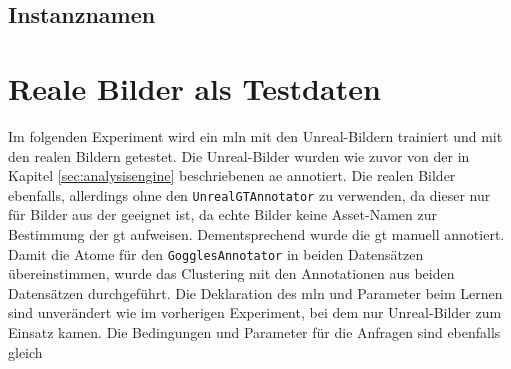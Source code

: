 

\subsection{Instanznamen}


\section{Reale Bilder als Testdaten}

Im folgenden Experiment wird ein \gls{mln} mit den Unreal-Bildern trainiert und mit den realen Bildern getestet. Die Unreal-Bilder wurden wie zuvor von der in Kapitel \ref{sec:analysisengine} beschriebenen \gls{ae} annotiert. Die realen Bilder ebenfalls, allerdings ohne den \texttt{UnrealGTAnnotator} zu verwenden, da dieser nur für Bilder aus der \unreal geeignet ist, da echte Bilder keine Asset-Namen zur Bestimmung der \gls{gt} aufweisen. Dementsprechend wurde die \gls{gt} manuell annotiert. Damit die Atome für den \texttt{GogglesAnnotator} in beiden Datensätzen übereinstimmen, wurde das Clustering mit den Annotationen aus beiden Datensätzen durchgeführt. Die Deklaration des \gls{mln} und Parameter beim Lernen sind unverändert wie im vorherigen Experiment, bei dem nur Unreal-Bilder zum Einsatz kamen. Die Bedingungen und Parameter für die Anfragen sind ebenfalls gleich \par

